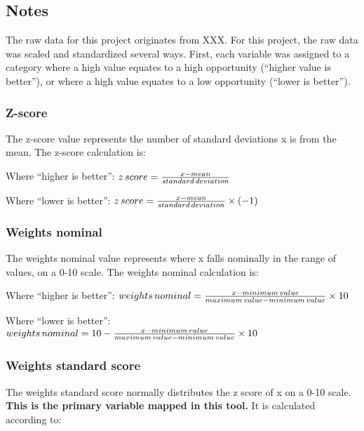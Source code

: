 \documentclass[
]{article}
\author{}
\date{\vspace{-2.5em}}
\begin{document}
\hypertarget{notes}{%
\subsection{Notes}\label{notes}}

The raw data for this project originates from XXX. For this project, the
raw data was scaled and standardized several ways. First, each variable
was assigned to a category where a high value equates to a high
opportunity (``higher value is better''), or where a high value equates
to a low opportunity (``lower is better'').

\hypertarget{z-score}{%
\subsubsection{Z-score}\label{z-score}}

The z-score value represents the number of standard deviations x is from
the mean. The z-score calculation is:

Where ``higher is better'':
\(z \, score = \frac{x - mean}{standard\,deviation}\\\)

Where ``lower is better'':
\(z \, score = \frac{x - mean}{standard\,deviation}\times (-1)\\\)

\hypertarget{weights-nominal}{%
\subsubsection{Weights nominal}\label{weights-nominal}}

The weights nominal value represents where x falls nominally in the
range of values, on a 0-10 scale. The weights nominal calculation is:

Where ``higher is better'':
\(weights \, nominal = \frac{x - minimum\,value}{maximum\,value - minimum\,value}\times 10\\\)

Where ``lower is better'':
\(weights \, nominal = 10 - \frac{x - minimum\,value}{maximum\,value - minimum\,value}\times 10\\\)

\hypertarget{weights-standard-score}{%
\subsubsection{Weights standard score}\label{weights-standard-score}}

The weights standard score normally distributes the z score of x on a
0-10 scale. \textbf{This is the primary variable mapped in this tool.}
It is calculated according to:
\end{document}
